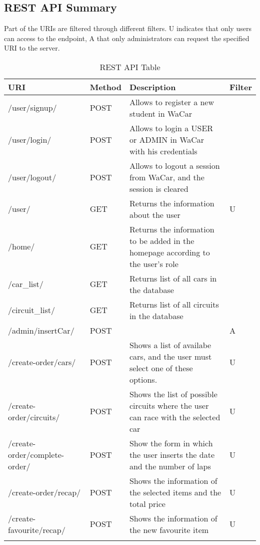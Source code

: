\subsection{REST API Summary}

Part of the URIs are filtered through different filters. U indicates that only users can access to the endpoint,
A that only administrators can request the specified URI to the server.

\begin{longtable}{|p{}|p{} |p{}|p{}|} 
\hline
\textbf{URI} & \textbf{Method} & \textbf{Description} & \textbf{Filter} \\\hline
/user/signup/  & POST &  Allows to register a new student in WaCar & \\\hline
/user/login/  & POST &  Allows to login a USER or ADMIN in WaCar with his credentials & \\\hline
/user/logout/  & POST &  Allows to logout a session from WaCar, and the session is cleared & \\\hline
/user/ & GET &  Returns the information about the user & U \\\hline
/home/  & GET &  Returns the information to be added in the homepage according to the user's role & \\\hline
/car\_list/  & GET &  Returns list of all cars in the database & \\\hline
/circuit\_list/  & GET &  Returns list of all circuits in the database & \\\hline
/admin/insertCar/ & POST &   & A\\\hline
/create-order/cars/ & POST & Shows a list of availabe cars, and the user must select one of these options. & U\\\hline
/create-order/circuits/ & POST & Shows the list of possible circuits where the user can race with the selected car & U\\\hline
/create-order/complete-order/ & POST & Show the form in which the user inserts the date and the number of laps & U\\\hline
/create-order/recap/ & POST & Shows the information of the selected items and the total price & U\\\hline
/create-favourite/recap/ & POST & Shows the information of the new favourite item & U\\\hline

\caption{REST API Table}
\label{tab:termGlossary}
\end{longtable}